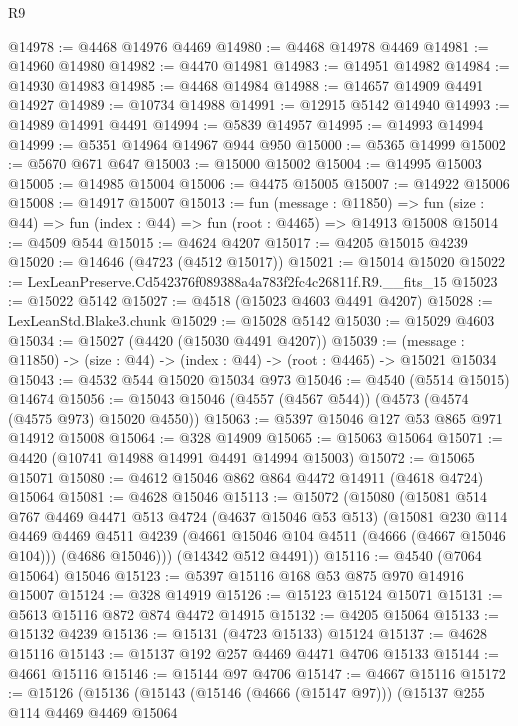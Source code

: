\begin{lexlean}{R9}
\begin{coremodule}
@14978 := @4468 @14976 @4469
@14980 := @4468 @14978 @4469
@14981 := @14960 @14980
@14982 := @4470 @14981
@14983 := @14951 @14982
@14984 := @14930 @14983
@14985 := @4468 @14984
@14988 := @14657 @14909 @4491 @14927
@14989 := @10734 @14988
@14991 := @12915 @5142 @14940
@14993 := @14989 @14991 @4491
@14994 := @5839 @14957
@14995 := @14993 @14994
@14999 := @5351 @14964 @14967 @944 @950
@15000 := @5365 @14999
@15002 := @5670 @671 @647
@15003 := @15000 @15002
@15004 := @14995 @15003
@15005 := @14985 @15004
@15006 := @4475 @15005
@15007 := @14922 @15006
@15008 := @14917 @15007
@15013 := fun (message : @11850) =>
  fun (size : @44) => fun (index : @44) => fun (root : @4465) => @14913 @15008
@15014 := @4509 @544
@15015 := @4624 @4207
@15017 := @4205 @15015 @4239
@15020 := @14646 (@4723 (@4512 @15017))
@15021 := @15014 @15020
@15022 := LexLeanPreserve.Cd542376f089388a4a783f2fc4c26811f.R9.__fits_15
@15023 := @15022 @5142
@15027 := @4518 (@15023 @4603 @4491 @4207)
@15028 := LexLeanStd.Blake3.chunk
@15029 := @15028 @5142
@15030 := @15029 @4603
@15034 := @15027 (@4420 (@15030 @4491 @4207))
@15039 := (message : @11850) -> (size : @44) -> (index : @44) -> (root : @4465) -> @15021 @15034
@15043 := @4532 @544 @15020 @15034 @973
@15046 := @4540 (@5514 @15015) @14674
@15056 := @15043 @15046 (@4557 (@4567 @544)) (@4573 (@4574 (@4575 @973) @15020 @4550))
@15063 := @5397 @15046 @127 @53 @865 @971 @14912 @15008
@15064 := @328 @14909
@15065 := @15063 @15064
@15071 := @4420 (@10741 @14988 @14991 @4491 @14994 @15003)
@15072 := @15065 @15071
@15080 := @4612 @15046 @862 @864 @4472 @14911 (@4618 @4724) @15064
@15081 := @4628 @15046
@15113 := @15072
    (@15080
      (@15081
        @514
        @767
        @4469
        @4471
        @513
        @4724
        (@4637 @15046 @53 @513)
        (@15081
          @230
          @114
          @4469
          @4469
          @4511
          @4239
          (@4661 @15046 @104 @4511 (@4666 (@4667 @15046 @104)))
          (@4686 @15046)))
      (@14342 @512 @4491))
@15116 := @4540 (@7064 @15064) @15046
@15123 := @5397 @15116 @168 @53 @875 @970 @14916 @15007
@15124 := @328 @14919
@15126 := @15123 @15124 @15071
@15131 := @5613 @15116 @872 @874 @4472 @14915
@15132 := @4205 @15064
@15133 := @15132 @4239
@15136 := @15131 (@4723 @15133) @15124
@15137 := @4628 @15116
@15143 := @15137 @192 @257 @4469 @4471 @4706 @15133
@15144 := @4661 @15116
@15146 := @15144 @97 @4706
@15147 := @4667 @15116
@15172 := @15126
    (@15136
      (@15143
        (@15146 (@4666 (@15147 @97)))
        (@15137
          @255
          @114
          @4469
          @4469
          @15064

\end{coremodule}
\end{lexlean}
